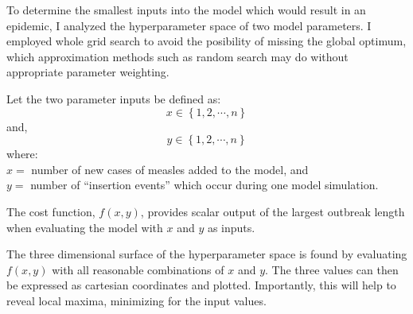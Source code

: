 \documentclass[../Paper.tex]{subfiles}
\begin{document}
  \justifying
  To determine the smallest inputs into the model which would result in
  an epidemic, I analyzed the hyperparameter space of two model parameters.
  I employed whole grid search to avoid the posibility of missing the global optimum,
  which approximation methods such as random search may do without appropriate
  parameter weighting.

  Let the two parameter inputs be defined as:
  \begin{equation}
    x \in \left\{1, 2, \cdots, n \right\}
  \end{equation}
  and,
  \begin{equation}
    y \in \left\{1, 2, \cdots, n \right\}
  \end{equation}
  where:\\
  $x =$ number of new cases of measles added to the model, and\\
  $y =$ number of ``insertion events'' which occur during one model simulation.

  The cost function, $f(x, y)$, provides scalar output of the largest outbreak length
  when evaluating the model with $x$ and $y$ as inputs.

  The three dimensional surface of the hyperparameter space is found by evaluating $f(x,y)$
  with all reasonable combinations of $x$ and $y$. The three values can then be
  expressed as cartesian coordinates and plotted. Importantly, this will help to reveal
  local maxima, minimizing for the input values.

  
  \clearpage
\end{document}
